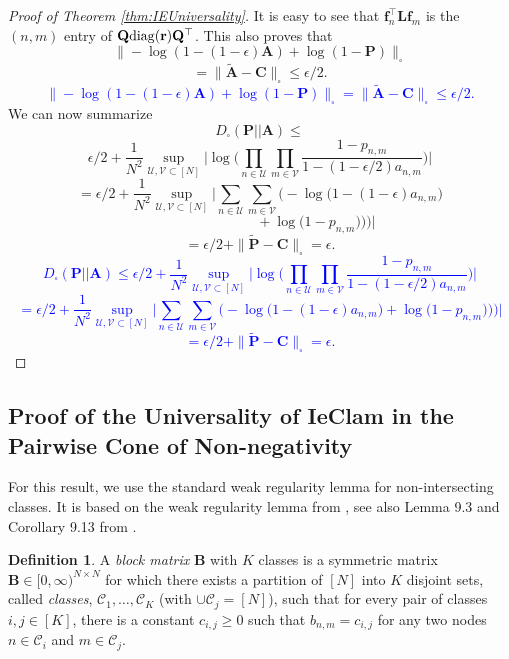 \documentclass{article}
\theoremstyle{plain}
\theoremstyle{definition}
\newtheorem{definition}[theorem]{Definition}
\theoremstyle{remark}
\newcommand{\dan}[1]{{{\textcolor{blue}{ {#1}\textbf{}}}}}
\begin{document}
\begin{proof}[Proof of Theorem \ref{thm:IEUniversality}]
It is easy to see that $\mathbf{f}_n^\top\mathbf{L}\mathbf{f}_m$ is the $(n,m)$ entry of $\mathbf{Q}{\rm diag}(\mathbf{r})\mathbf{Q}^{\top }$. 
This also proves that
{\color{orange}
\[\|-\log(1-(1-\epsilon)\mathbf{A})+\log(1-\mathbf{P})\|_{\square}\]
\[=\|\tilde{\mathbf{A}}-\mathbf{C}\|_{\square} \leq \epsilon/2.\]
}
\dan{
\[\|-\log(1-(1-\epsilon)\mathbf{A})+\log(1-\mathbf{P})\|_{\square} = \|\tilde{\mathbf{A}}-\mathbf{C}\|_{\square} \leq \epsilon/2.\]
}
%
We can now summarize
{\color{orange}
\[D_{\square}(\mathbf{P}||\mathbf{A}) \leq \]
\[\epsilon/2+\frac{1}{N^2}\sup_{\mathcal{U},\mathcal{V}\subset[N]}\Big|\log\Big(\prod_{n\in \mathcal{U}}\prod_{m\in \mathcal{V}}
\frac{1-p_{n,m}}{1-(1-\epsilon/2)a_{n,m}}\Big)\Big|\]
\[ =
\epsilon/2+\frac{1}{N^2}\sup_{\mathcal{U},\mathcal{V}\subset[N]}\Big|\sum_{n\in \mathcal{U}}\sum_{m\in \mathcal{V}}\Big(-\log\big(1-(1-\epsilon)a_{n,m}\big) \]
\[\quad \quad \quad \quad\quad \quad \quad \quad + \log\big(1-p_{n,m})\big)\Big)\Big|\]
\[=\epsilon/2 + \| \tilde{\mathbf{P}}-\mathbf{C} \|_{\square} = \epsilon. \]
}
\dan{
\[D_{\square}(\mathbf{P}||\mathbf{A}) \leq \epsilon/2+\frac{1}{N^2}\sup_{\mathcal{U},\mathcal{V}\subset[N]}\Big|\log\Big(\prod_{n\in \mathcal{U}}\prod_{m\in \mathcal{V}}
\frac{1-p_{n,m}}{1-(1-\epsilon/2)a_{n,m}}\Big)\Big|\]
\[ =
\epsilon/2+\frac{1}{N^2}\sup_{\mathcal{U},\mathcal{V}\subset[N]}\Big|\sum_{n\in \mathcal{U}}\sum_{m\in \mathcal{V}}\Big(-\log\big(1-(1-\epsilon)a_{n,m}\big) + \log\big(1-p_{n,m})\big)\Big)\Big|\]
\[=\epsilon/2 + \| \tilde{\mathbf{P}}-\mathbf{C} \|_{\square} = \epsilon. \]
}
\end{proof}


\subsection{Proof of the Universality of IeClam in the Pairwise Cone of Non-negativity}
\label{Proof of the Universality of IeClam in a Cone of Non-negativity}

For this result, we use the standard weak regularity lemma for non-intersecting classes.  It is based on the weak regularity lemma from \cite{weakReg,Szemeredi_analyst}, see also Lemma 9.3 and Corollary 9.13 from \cite{cut-homo3}.

\begin{definition}
    A \emph{block matrix} $\mathbf{B}$ with $K$ classes is a symmetric matrix $\mathbf{B}\in[0,\infty)^{N\times N}$ for which there exists a partition of $[N]$ into $K$ disjoint sets, called \emph{classes}, $\mathcal{C}_1,\ldots,\mathcal{C}_K$ (with $\cup\mathcal{C}_j=[N]$), such that for every pair of classes $i,j\in[K]$, there is a constant $c_{i,j}\geq 0$ such that  $b_{n,m}=c_{i,j}$ for any two nodes $n\in\mathcal{C}_i$ and $m\in\mathcal{C}_j$.
\end{definition}
\end{document}
